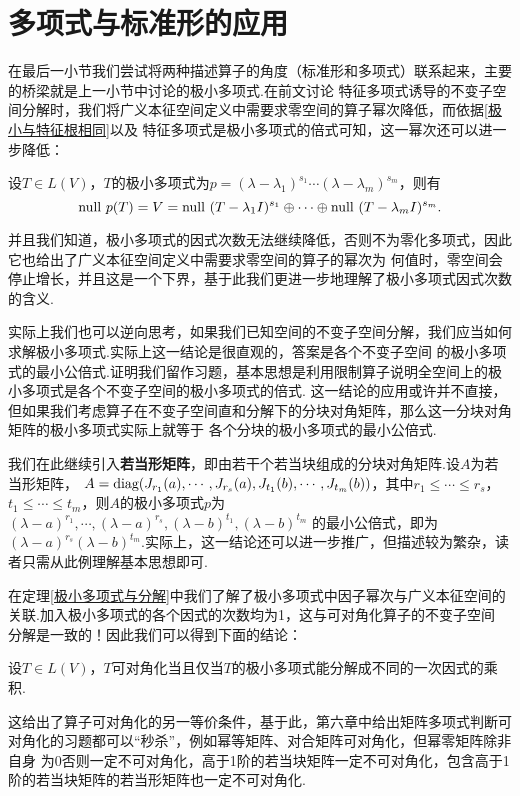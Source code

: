 \section{多项式与标准形的应用}
在最后一小节我们尝试将两种描述算子的角度（标准形和多项式）联系起来，主要的桥梁就是上一小节中讨论的极小多项式.在前文讨论
特征多项式诱导的不变子空间分解时，我们将广义本征空间定义中需要求零空间的算子幂次降低，而依据\ref{极小与特征根相同}以及
特征多项式是极小多项式的倍式可知，这一幂次还可以进一步降低：
\begin{theorem}\label{极小多项式与分解}
	设$T\in L(V)$，$T$的极小多项式为$p=(\lambda-\lambda_1)^{s_1}\cdots(\lambda-\lambda_m)^{s_m}$，则有
	$$\textup{null }p(T)=V=\textup{null }(T-\lambda_1I)^{s_1}\oplus\cdots\oplus\textup{null }(T-\lambda_mI)^{s_m}.$$
\end{theorem}
并且我们知道，极小多项式的因式次数无法继续降低，否则不为零化多项式，因此它也给出了广义本征空间定义中需要求零空间的算子的幂次为
何值时，零空间会停止增长，并且这是一个下界，基于此我们更进一步地理解了极小多项式因式次数的含义.

实际上我们也可以逆向思考，如果我们已知空间的不变子空间分解，我们应当如何求解极小多项式.实际上这一结论是很直观的，答案是各个不变子空间
的极小多项式的最小公倍式.证明我们留作习题，基本思想是利用限制算子说明全空间上的极小多项式是各个不变子空间的极小多项式的倍式.
这一结论的应用或许并不直接，但如果我们考虑算子在不变子空间直和分解下的分块对角矩阵，那么这一分块对角矩阵的极小多项式实际上就等于
各个分块的极小多项式的最小公倍式.
\begin{example}\label{若当形矩阵极小多项式}
	我们在此继续引入\textbf{若当形矩阵}，即由若干个若当块组成的分块对角矩阵.设$A$为若当形矩阵，
	$A=\textup{diag}(J_{r_1}(a),\cdots,J_{r_s}(a),J_{t_1}(b),\cdots,J_{t_m}(b))$，其中$r_1\le\cdots\le r_s$，
	$t_1\le\cdots\le t_m$，则$A$的极小多项式$p$为$(\lambda-a)^{r_1},\cdots,(\lambda-a)^{r_s},(\lambda-b)^{t_1},(\lambda-b)^{t_m}$
	的最小公倍式，即为$(\lambda-a)^{r_s}(\lambda-b)^{t_m}$.实际上，这一结论还可以进一步推广，但描述较为繁杂，读者只需从此例理解基本思想即可.
\end{example}
在定理\ref{极小多项式与分解}中我们了解了极小多项式中因子幂次与广义本征空间的关联.加入极小多项式的各个因式的次数均为1，这与可对角化算子的不变子空间
分解是一致的！因此我们可以得到下面的结论：
\begin{theorem}
	设$T\in L(V)$，$T$可对角化当且仅当$T$的极小多项式能分解成不同的一次因式的乘积.
\end{theorem}
这给出了算子可对角化的另一等价条件，基于此，第六章中给出矩阵多项式判断可对角化的习题都可以“秒杀”，例如幂等矩阵、对合矩阵可对角化，但幂零矩阵除非自身
为0否则一定不可对角化，高于1阶的若当块矩阵一定不可对角化，包含高于1阶的若当块矩阵的若当形矩阵也一定不可对角化.


